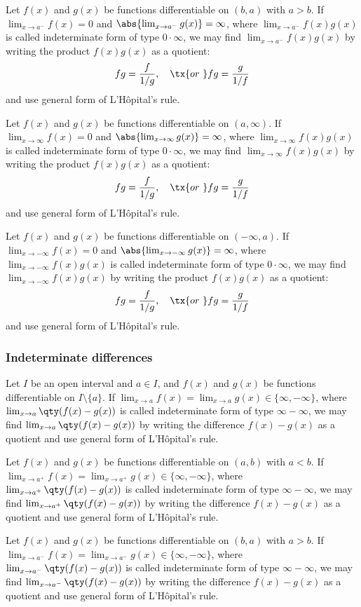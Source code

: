 Let $f(x)$ and $g(x)$ be functions differentiable on $(b,a)$ with $a>b$. If $\lim_{x\to a^-}f(x)=0$ and $\abs{\lim_{x\to a^-}g(x)}=\infty$, where $\lim_{x\to a^-}f(x)g(x)$ is called indeterminate form of type $0\cdot\infty$, we may find $\lim_{x\to a^-}f(x)g(x)$ by writing the product $f(x)g(x)$ as a quotient:
\[fg=\frac{f}{1/g},\quad\tx{or\ }fg=\frac{g}{1/f}\]
and use general form of L'Hôpital's rule.

Let $f(x)$ and $g(x)$ be functions differentiable on $(a,\infty)$. If $\lim_{x\to\infty}f(x)=0$ and $\abs{\lim_{x\to\infty}g(x)}=\infty$, where $\lim_{x\to\infty}f(x)g(x)$ is called indeterminate form of type $0\cdot\infty$, we may find $\lim_{x\to\infty}f(x)g(x)$ by writing the product $f(x)g(x)$ as a quotient:
\[fg=\frac{f}{1/g},\quad\tx{or\ }fg=\frac{g}{1/f}\]
and use general form of L'Hôpital's rule.

Let $f(x)$ and $g(x)$ be functions differentiable on $(-\infty,a)$. If $\lim_{x\to -\infty}f(x)=0$ and $\abs{\lim_{x\to -\infty}g(x)}=\infty$, where $\lim_{x\to -\infty}f(x)g(x)$ is called indeterminate form of type $0\cdot\infty$, we may find $\lim_{x\to -\infty}f(x)g(x)$ by writing the product $f(x)g(x)$ as a quotient:
\[fg=\frac{f}{1/g},\quad\tx{or\ }fg=\frac{g}{1/f}\]
and use general form of L'Hôpital's rule.
\subsubsection{Indeterminate differences}
Let $I$ be an open interval and $a\in I$, and $f(x)$ and $g(x)$ be functions differentiable on $I\setminus\{a\}$. If $\lim_{x\to a}f(x)=\lim_{x\to a}g(x)\in\{\infty,-\infty\}$, where $\lim_{x\to a}\qty(f(x)-g(x))$ is called indeterminate form of type $\infty-\infty$, we may find $\lim_{x\to a}\qty(f(x)-g(x))$ by writing the difference $f(x)-g(x)$ as a quotient and use general form of L'Hôpital's rule.

Let $f(x)$ and $g(x)$ be functions differentiable on $(a,b)$ with $a<b$. If $\lim_{x\to a^+}f(x)=\lim_{x\to a^+}g(x)\in\{\infty,-\infty\}$, where $\lim_{x\to a^+}\qty(f(x)-g(x))$ is called indeterminate form of type $\infty-\infty$, we may find $\lim_{x\to a^+}\qty(f(x)-g(x))$ by writing the difference $f(x)-g(x)$ as a quotient and use general form of L'Hôpital's rule.

Let $f(x)$ and $g(x)$ be functions differentiable on $(b,a)$ with $a>b$. If $\lim_{x\to a^-}f(x)=\lim_{x\to a^-}g(x)\in\{\infty,-\infty\}$, where $\lim_{x\to a^-}\qty(f(x)-g(x))$ is called indeterminate form of type $\infty-\infty$, we may find $\lim_{x\to a^-}\qty(f(x)-g(x))$ by writing the difference $f(x)-g(x)$ as a quotient and use general form of L'Hôpital's rule.

